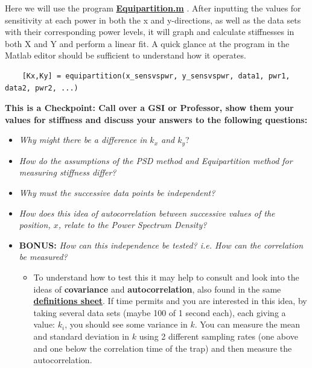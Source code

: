 \documentclass{../lab}
\begin{document}
Here we will use the program \href{http://experimentationlab.berkeley.edu/sites/default/files/matlab\_fitting/Equipartition.m}{\textbf{Equipartition.m}} . After inputting the values for sensitivity at each power in both the x and y-directions, as well as the data sets with their corresponding power levels, it will graph and calculate stiffnesses in both X and Y and perform a linear fit. A quick glance at the program in the Matlab editor should be sufficient to understand how it operates.
\begin{verbatim}
    [Kx,Ky] = equipartition(x_sensvspwr, y_sensvspwr, data1, pwr1, data2, pwr2, ...)
\end{verbatim}
\textbf{This is a Checkpoint: Call over a GSI or Professor, show them your values for stiffness and discuss your answers to the following questions:}
\begin{itemize}
    \item \emph{Why might there be a difference in $k_x$ and $k_y$}?

    \item \emph{How do the assumptions of the PSD method and Equipartition method for measuring stiffness differ?}

    \item \emph{Why must the successive data points be independent?}

    \item \emph{How does this idea of autocorrelation between successive values of the position, $x$, relate to the Power Spectrum Density?}

    \item \textbf{BONUS:} \emph{How can this independence be tested? i.e. How can the correlation be measured?}

    \begin{itemize}
        \item To understand how to test this it may help to consult \cite{Reif} and look into the ideas of \textbf{covariance} and \textbf{autocorrelation}, also found in the same \href{http://physics111.lib.berkeley.edu/Physics111/Reprints/OTZ/biowikipedia.pdf}{\textbf{definitions sheet}}. If time permits and you are interested in this idea, by taking several data sets (maybe 100 of 1 second each), each giving a value: $k_i$, you should see some variance in $k$. You can measure the mean and standard deviation in $k$ using 2 different sampling rates (one above and one below the correlation time of the trap) and then measure the autocorrelation.
    \end{itemize}

\end{itemize}
\end{document}
